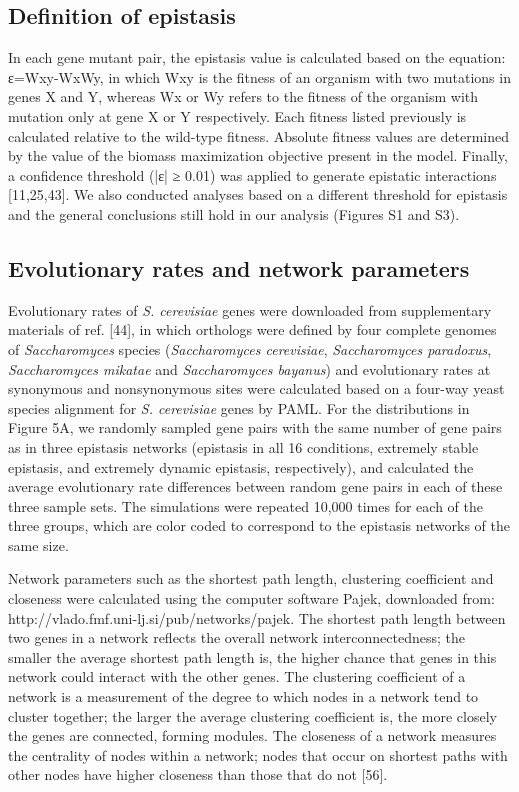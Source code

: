 \subsection{Definition of epistasis}

In each gene mutant pair, the epistasis value is calculated based on
the equation: ε=Wxy-WxWy, in which Wxy is the fitness of an organism
with two mutations in genes X and Y, whereas Wx or Wy refers to the
fitness of the organism with mutation only at gene X or Y
respectively. Each fitness listed previously is calculated relative to
the wild-type fitness. Absolute fitness values are determined by the
value of the biomass maximization objective present in the
model. Finally, a confidence threshold (|ε| ≥ 0.01) was applied to
generate epistatic interactions [11,25,43]. We also conducted analyses
based on a different threshold for epistasis and the general
conclusions still hold in our analysis (Figures S1 and S3).

\subsection{Evolutionary rates and network parameters}

Evolutionary rates of \textit{S. cerevisiae} genes were downloaded
from supplementary materials of ref. [44], in which orthologs were
defined by four complete genomes of \textit{Saccharomyces} species
(\textit{Saccharomyces cerevisiae}, \textit{Saccharomyces paradoxus},
\textit{Saccharomyces mikatae} and \textit{Saccharomyces bayanus}) and
evolutionary rates at synonymous and nonsynonymous sites were
calculated based on a four-way yeast species alignment for
\textit{S. cerevisiae} genes by PAML. For the distributions in Figure
5A, we randomly sampled gene pairs with the same number of gene pairs
as in three epistasis networks (epistasis in all 16 conditions,
extremely stable epistasis, and extremely dynamic epistasis,
respectively), and calculated the average evolutionary rate
differences between random gene pairs in each of these three sample
sets. The simulations were repeated 10,000 times for each of the three
groups, which are color coded to correspond to the epistasis networks
of the same size.

Network parameters such as the shortest path length, clustering
coefficient and closeness were calculated using the computer software
Pajek, downloaded from:
http://vlado.fmf.uni-lj.si/pub/networks/pajek. The shortest path
length between two genes in a network reflects the overall network
interconnectedness; the smaller the average shortest path length is,
the higher chance that genes in this network could interact with the
other genes. The clustering coefficient of a network is a measurement
of the degree to which nodes in a network tend to cluster together;
the larger the average clustering coefficient is, the more closely the
genes are connected, forming modules. The closeness of a network
measures the centrality of nodes within a network; nodes that occur on
shortest paths with other nodes have higher closeness than those that
do not [56].

